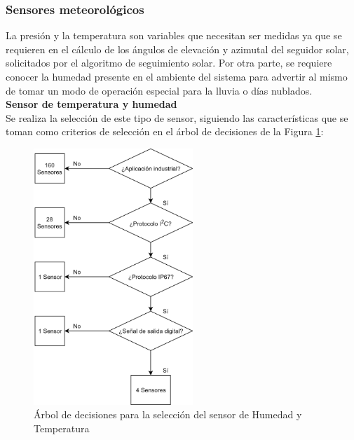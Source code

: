 




\newpage
\subsubsection{Sensores meteorológicos}
La presión y la temperatura son variables que necesitan ser medidas ya que se requieren en el cálculo de los ángulos de elevación y azimutal del seguidor solar, solicitados por el algoritmo de seguimiento solar. Por otra parte, se requiere conocer la humedad presente en el ambiente del sistema para advertir al mismo de tomar un modo de operación especial para la lluvia o días nublados.\\

\textbf{Sensor de temperatura y humedad}\\

Se realiza la selección de este tipo de sensor, siguiendo las características que se toman como criterios de selección en el árbol de decisiones de la Figura \ref{fig:HT1}:

\begin{figure}[H]
	\centering
	\includegraphics[width=6cm]{imagenes/HT1}
	\caption{Árbol de decisiones para la selección del sensor de Humedad y Temperatura}
	\label{fig:HT1}
\end{figure}

